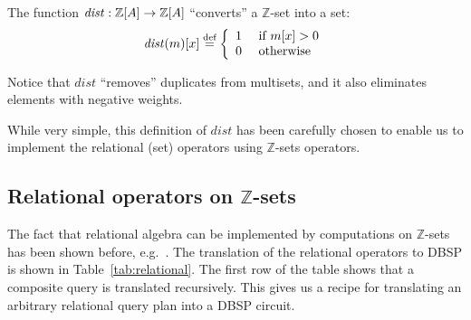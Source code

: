 \documentclass[twocolumn
]{svjour3}
\newif\ifzsetexamples
\numberwithin{equation}{section}
\newcommand{\dbsp}{DBSP\xspace}
\newcommand{\defined}[1]{\textbf{#1}\index{}}
\newcommand{\zr}{$\Z$-set\xspace}
\newcommand{\zrs}{$\Z$-sets\xspace} %
\newcommand{\Z}{\mathbb{Z}}  %
\newcommand{\N}{\mathbb{N}}  %
\newcommand{\stream}[1]{\ensuremath{\mathcal{S}_{#1}}}
\newcommand{\I}{\mathcal{I}}  %
\newcommand{\D}{\mathcal{D}}  %
\newcommand{\I}{\mathit{I}}  %
\newcommand{\D}{\mathit{D}}  %
\newcommand{\distinct}{\mathit{dist}}  %
\newcommand{\defn}{\stackrel{\textrm{\scriptsize def}}{=}}
\begin{document}
\begin{definition}[distinct]
The function $\distinct: \\ \Z[A] \rightarrow \Z[A]$
``converts'' a \zr into a set:
$$\distinct(m)[x] \defn \left\{
\begin{array}{ll}
  1 & \mbox{ if } m[x] > 0 \\
  0 & \mbox{ otherwise}
\end{array}
\right.
$$
\end{definition}

Notice that $\distinct$ ``removes'' duplicates from multisets, and it also eliminates
elements with negative weights.
\ifzsetexamples
$\distinct(R) = \{ \texttt{joe} \mapsto 1, \texttt{mary} \mapsto 1 \}$.
\fi
While very simple, this definition of $\distinct$ has been carefully
chosen to enable us to implement the relational (set) operators
using \zrs operators.

%
%
\subsection{Relational operators on \zrs}\label{sec:relational-operators}

The fact that relational algebra can be implemented by computations
on \zrs has been shown before, e.g.~\cite{green-pods07}.  The translation
of the relational operators to \dbsp is shown in Table~\ref{tab:relational}.
The first row of the table shows that a composite query is translated
recursively.  This gives us a recipe for
translating an arbitrary relational query plan into a \dbsp circuit.
\end{document}
